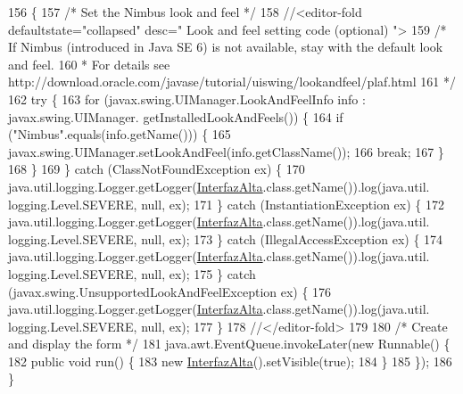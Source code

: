 \begin{DoxyCode}
156                                            \{
157         \textcolor{comment}{/* Set the Nimbus look and feel */}
158         \textcolor{comment}{//<editor-fold defaultstate="collapsed" desc=" Look and feel setting code (optional) ">}
159         \textcolor{comment}{/* If Nimbus (introduced in Java SE 6) is not available, stay with the default look and feel.}
160 \textcolor{comment}{         * For details see http://download.oracle.com/javase/tutorial/uiswing/lookandfeel/plaf.html }
161 \textcolor{comment}{         */}
162         \textcolor{keywordflow}{try} \{
163             \textcolor{keywordflow}{for} (javax.swing.UIManager.LookAndFeelInfo info : javax.swing.UIManager.
      getInstalledLookAndFeels()) \{
164                 \textcolor{keywordflow}{if} (\textcolor{stringliteral}{"Nimbus"}.equals(info.getName())) \{
165                     javax.swing.UIManager.setLookAndFeel(info.getClassName());
166                     \textcolor{keywordflow}{break};
167                 \}
168             \}
169         \} \textcolor{keywordflow}{catch} (ClassNotFoundException ex) \{
170             java.util.logging.Logger.getLogger(\mbox{\hyperlink{class_interfaz_package_1_1_interfaz_alta_a34f6dce200e1d6e15b1619d6413e6330}{InterfazAlta}}.class.getName()).log(java.util.
      logging.Level.SEVERE, null, ex);
171         \} \textcolor{keywordflow}{catch} (InstantiationException ex) \{
172             java.util.logging.Logger.getLogger(\mbox{\hyperlink{class_interfaz_package_1_1_interfaz_alta_a34f6dce200e1d6e15b1619d6413e6330}{InterfazAlta}}.class.getName()).log(java.util.
      logging.Level.SEVERE, null, ex);
173         \} \textcolor{keywordflow}{catch} (IllegalAccessException ex) \{
174             java.util.logging.Logger.getLogger(\mbox{\hyperlink{class_interfaz_package_1_1_interfaz_alta_a34f6dce200e1d6e15b1619d6413e6330}{InterfazAlta}}.class.getName()).log(java.util.
      logging.Level.SEVERE, null, ex);
175         \} \textcolor{keywordflow}{catch} (javax.swing.UnsupportedLookAndFeelException ex) \{
176             java.util.logging.Logger.getLogger(\mbox{\hyperlink{class_interfaz_package_1_1_interfaz_alta_a34f6dce200e1d6e15b1619d6413e6330}{InterfazAlta}}.class.getName()).log(java.util.
      logging.Level.SEVERE, null, ex);
177         \}
178         \textcolor{comment}{//</editor-fold>}
179 
180         \textcolor{comment}{/* Create and display the form */}
181         java.awt.EventQueue.invokeLater(\textcolor{keyword}{new} Runnable() \{
182             \textcolor{keyword}{public} \textcolor{keywordtype}{void} run() \{
183                 \textcolor{keyword}{new} \mbox{\hyperlink{class_interfaz_package_1_1_interfaz_alta_a34f6dce200e1d6e15b1619d6413e6330}{InterfazAlta}}().setVisible(\textcolor{keyword}{true});
184             \}
185         \});
186     \}
\end{DoxyCode}


